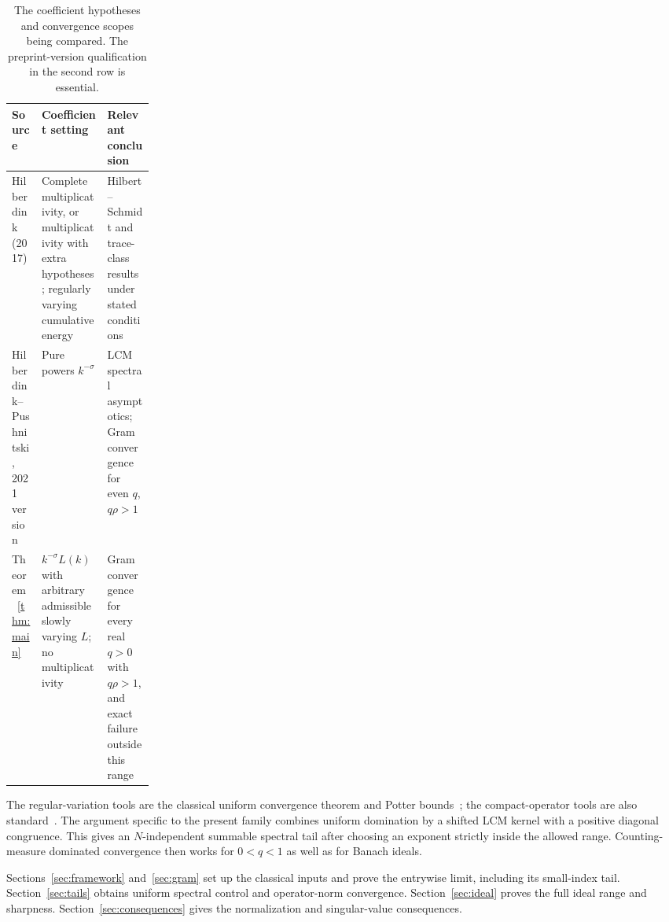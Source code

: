 \begin{table}[t]
\centering
\small
\caption{The coefficient hypotheses and convergence scopes being compared.
The preprint-version qualification in the second row is essential.}
\label{tab:scope}
\begin{tabularx}{\linewidth}{@{}>{\raggedright\arraybackslash}p{0.21\linewidth}
 >{\raggedright\arraybackslash}X>{\raggedright\arraybackslash}X@{}}
\toprule
Source & Coefficient setting & Relevant conclusion \\
\midrule
Hilberdink (2017) & Complete multiplicativity, or multiplicativity
with extra hypotheses; regularly varying cumulative energy &
Hilbert--Schmidt and trace-class results under stated conditions \\
\addlinespace
Hilberdink--Pushnitski, 2021 version & Pure powers $k^{-\sigma}$ &
LCM spectral asymptotics; Gram convergence for even $q$,
$q\rho>1$ \\
\addlinespace
Theorem~\ref{thm:main} & $k^{-\sigma}L(k)$ with arbitrary admissible
slowly varying $L$; no multiplicativity & Gram convergence for every
real $q>0$ with $q\rho>1$, and exact failure outside this range \\
\bottomrule
\end{tabularx}
\end{table}

The regular-variation tools are the classical uniform convergence
theorem and Potter bounds~\cite{BinghamGoldieTeugels1987};
the compact-operator tools are also standard~\cite{Simon2005}.
The argument specific to the present family combines uniform domination
by a shifted LCM kernel with a positive diagonal congruence. This gives
an $N$-independent summable spectral tail after choosing an exponent
strictly inside the allowed range. Counting-measure dominated
convergence then works for $0<q<1$ as well as for Banach ideals.

Sections~\ref{sec:framework} and~\ref{sec:gram} set up the classical
inputs and prove the entrywise limit, including its small-index tail.
Section~\ref{sec:tails} obtains uniform spectral control and
operator-norm convergence. Section~\ref{sec:ideal} proves the full
ideal range and sharpness. Section~\ref{sec:consequences} gives the
normalization and singular-value consequences.

